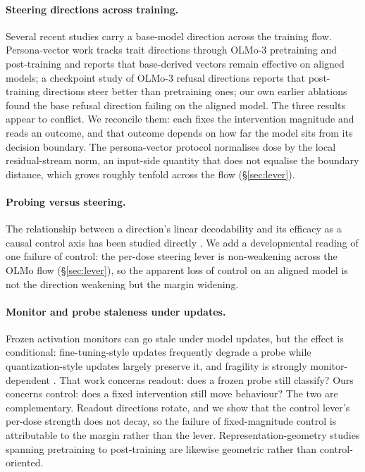 \documentclass{article}
\begin{document}
\paragraph{Steering directions across training.} Several recent studies carry a base-model direction
across the training flow. Persona-vector work \citep{personavectors} tracks trait directions through
OLMo-3 pretraining and post-training and reports that base-derived vectors remain effective on
aligned models; a checkpoint study of OLMo-3 refusal directions \citep{olmoharmfulness} reports that
post-training directions steer better than pretraining ones; our own earlier ablations found the
base refusal direction failing on the aligned model. The three results appear to conflict. We
reconcile them: each fixes the intervention magnitude and reads an outcome, and that outcome depends
on how far the model sits from its decision boundary. The persona-vector protocol normalises dose by
the local residual-stream norm, an input-side quantity that does not equalise the boundary distance,
which grows roughly tenfold across the flow (\S\ref{sec:lever}).

\paragraph{Probing versus steering.} The relationship between a direction's linear decodability and
its efficacy as a causal control axis has been studied directly \citep{decodecontrol}. We add a
developmental reading of one failure of control: the per-dose steering lever is non-weakening across the
OLMo flow (\S\ref{sec:lever}), so the apparent loss of control on an aligned model is not the
direction weakening but the margin widening.

\paragraph{Monitor and probe staleness under updates.} Frozen activation monitors can go stale under
model updates, but the effect is conditional: fine-tuning-style updates frequently degrade a probe
while quantization-style updates largely preserve it, and fragility is strongly monitor-dependent
\citep{monitorstaleness}. That work concerns readout: does a frozen probe still classify? Ours
concerns control: does a fixed intervention still move behaviour? The two are complementary.
Readout directions rotate, and we show
that the control lever's per-dose strength does not decay, so the failure of fixed-magnitude control
is attributable to the margin rather than the lever. Representation-geometry studies spanning
pretraining to post-training \citep{tracinggeometry} are likewise geometric rather than
control-oriented.
\end{document}

